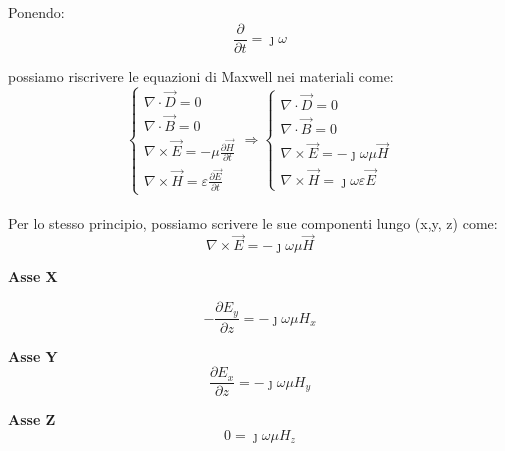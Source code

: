 Ponendo: 
{
    \Large
    \begin{equation}
    \frac{\partial}{\partial t} = \jmath \omega   
    \end{equation}
}

possiamo riscrivere le equazioni di Maxwell nei materiali come: \\   

{ \Large \begin{equation}
    \begin{cases}
        \nabla \cdot \vec{D} = 0 \\
        \nabla \cdot \vec{B} = 0 \\
        \nabla \times \vec{E} = -\mu \frac{\partial \vec{H}}{\partial t} \\
        \nabla \times \vec{H} = \varepsilon \frac{\partial \vec{E}}{\partial t}  

    \end{cases} 
    \Rightarrow
    \begin{cases}
        \nabla \cdot \vec{D} = 0 \\
        \nabla \cdot \vec{B} = 0 \\
        \nabla \times \vec{E} = - \jmath \omega \mu \vec{H} \\
        \nabla \times \vec{H} = \jmath \omega \varepsilon \vec{E}  

    \end{cases}
\end{equation}} \\ 


Per lo stesso principio, possiamo scrivere le sue componenti lungo (x,y, z) come: \\ 

{
    \Large 
    \begin{equation}
    \nabla \times \vec{E} = - \jmath \omega \mu \vec{H}    
    \end{equation}
}

\textbf{Asse X} 

{
    \Large 
    \begin{equation}      
-\frac{\partial E_y}{\partial z} = -\jmath \omega \mu H_x 
    \end{equation}
}

\textbf{Asse Y}  
{
    \Large
    \begin{equation}
\frac{\partial E_x}{\partial z} = - \jmath \omega \mu H_y    
    \end{equation}
}

\textbf{Asse Z} 
{
    \Large
    \begin{equation}
        0 = \jmath \omega \mu H_z   
    \end{equation}
}

